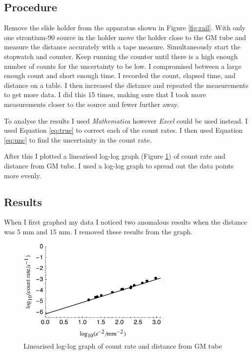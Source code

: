 \documentclass[twocolumn]{revtex4-1}
\begin{document}
\vspace{-4ex}
\subsection{Procedure}
\vspace{-3ex}

Remove the slide holder from the apparatus shown in Figure \ref{fig:rail}.
With only one strontium-90 source in the holder move the holder close to the GM tube and measure the distance accurately with a tape measure.
Simultaneously start the stopwatch and counter.
Keep running the counter until there is a high enough number of counts for the uncertainty to be low.
I compromised between a large enough count and short enough time.
I recorded the count, elapsed time, and distance on a table.
I then increased the distance and repeated the measurements to get more data.
I did this 15 times, making sure that I took more measurements closer to the source and fewer further away.

To analyse the results I used \textit{Mathematica\textregistered} however \textit{Excel\textregistered} could be used instead.
I used Equation \ref{eq:true} to correct each of the count rates.
I then used Equation \ref{eq:unc} to find the uncertainty in the count rate.

After this I plotted a linearised log-log graph (Figure \ref{fig:dep}) of count rate and distance from GM tube.
I used a log-log graph to spread out the data points more evenly.

\vspace{-5ex}
\subsection{Results}
\vspace{-3ex} 

When I first graphed my data I noticed two anomalous results when the distance was 5 mm and 15 mm.
I removed these results from the graph.

\begin{figure}[!h]
\begin{center}
\includegraphics[width=7.5cm]{dep}
\caption{Linearised log-log graph of count rate and distance from GM tube}
\label{fig:dep}
\end{center}
\end{figure}
\end{document}
